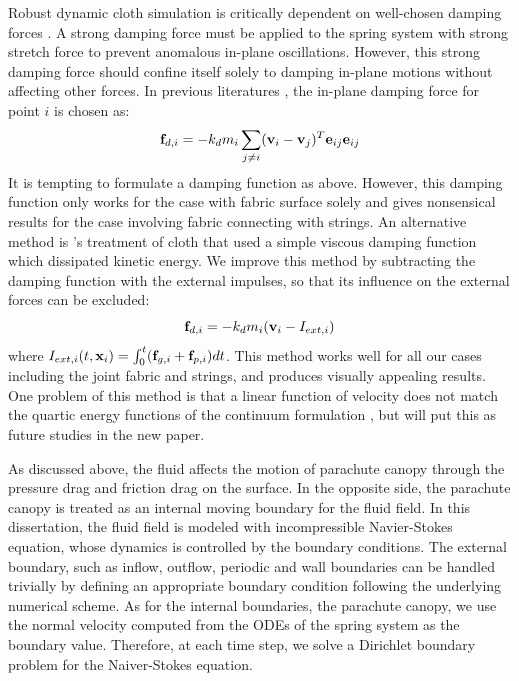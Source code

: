 Robust dynamic cloth simulation is critically dependent on well-chosen damping forces \cite{Baraff1998Large}. A strong damping force must be applied to the spring system with strong stretch force to prevent anomalous in-plane oscillations. However, this strong damping force should confine itself solely to damping in-plane motions without affecting other forces. In previous literatures \cite{Selle2009Robust}, the in-plane damping force for point $i$ is chosen as:
\begin{equation}
\mathbf{f}_{d,i} = -k_d m_i\sum_{j \neq i}(\mathbf{v}_i - \mathbf{v}_j)^T\mathbf{e}_{ij}\mathbf{e}_{ij}
\label{eq:damping_1} 
\end{equation}
It is tempting to formulate a damping function as above. However, this damping function only works for the case with fabric surface solely and gives nonsensical results for the case involving fabric connecting with strings. An alternative method is \cite{Terzopoulos1987, Terzopoulos1988, Carignan1992, Platt1988}'s treatment of cloth that used a simple viscous damping function which dissipated kinetic energy. We improve this method by subtracting the damping function with the external impulses, so that its influence on the external forces can be excluded:
\begin{equation}
\mathbf{f}_{d,i} = -k_d m_i(\mathbf{v}_i-I_{ext,i})
\end{equation}
where $I_{ext,i}(t,\mathbf{x}_i) = \int_0^t (\mathbf{f}_{g,i} + \mathbf{f}_{p,i}) dt$.
This method works well for all our cases including the joint fabric and strings, and produces visually appealing results. One problem of this method is that a linear function of velocity does not match the quartic energy functions of the continuum formulation \cite{Baraff1998Large}, but will put this as future studies in the new paper.

As discussed above, the fluid affects the motion of parachute canopy through the pressure drag and friction drag on the surface. In the opposite side, the parachute canopy is treated as an internal moving boundary for the fluid field. In this dissertation, the fluid field is modeled with incompressible Navier-Stokes equation, whose dynamics is controlled by the boundary conditions. The external boundary, such as inflow, outflow, periodic and wall boundaries can be handled trivially by defining an appropriate boundary condition following the underlying numerical scheme. As for the internal boundaries, the parachute canopy, we use the normal velocity computed from the ODEs of the spring system as the boundary value. Therefore, at each time step, we solve a Dirichlet boundary problem for the Naiver-Stokes equation.
